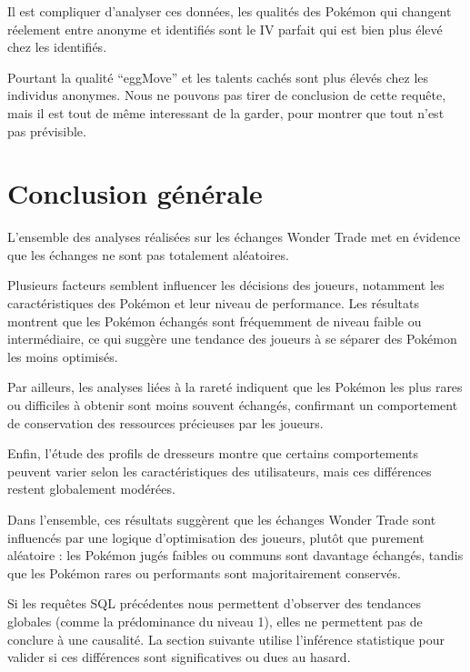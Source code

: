 \documentclass[mstat,12pt]{unswthesis}
\begin{document}
Il est compliquer d'analyser ces données, les qualités des Pokémon qui
changent réelement entre anonyme et identifiés sont le IV parfait qui
est bien plus élevé chez les identifiés.

Pourtant la qualité ``eggMove'' et les talents cachés sont plus élevés
chez les individus anonymes. Nous ne pouvons pas tirer de conclusion de
cette requête, mais il est tout de même interessant de la garder, pour
montrer que tout n'est pas prévisible.

\bigskip
\bigskip

\section{Conclusion générale}\label{conclusion-guxe9nuxe9rale}

L'ensemble des analyses réalisées sur les échanges Wonder Trade met en
évidence que les échanges ne sont pas totalement aléatoires.

Plusieurs facteurs semblent influencer les décisions des joueurs,
notamment les caractéristiques des Pokémon et leur niveau de
performance. Les résultats montrent que les Pokémon échangés sont
fréquemment de niveau faible ou intermédiaire, ce qui suggère une
tendance des joueurs à se séparer des Pokémon les moins optimisés.

Par ailleurs, les analyses liées à la rareté indiquent que les Pokémon
les plus rares ou difficiles à obtenir sont moins souvent échangés,
confirmant un comportement de conservation des ressources précieuses par
les joueurs.

Enfin, l'étude des profils de dresseurs montre que certains
comportements peuvent varier selon les caractéristiques des
utilisateurs, mais ces différences restent globalement modérées.

Dans l'ensemble, ces résultats suggèrent que les échanges Wonder Trade
sont influencés par une logique d'optimisation des joueurs, plutôt que
purement aléatoire : les Pokémon jugés faibles ou communs sont davantage
échangés, tandis que les Pokémon rares ou performants sont
majoritairement conservés.

\bigskip
\bigskip

Si les requêtes SQL précédentes nous permettent d'observer des tendances
globales (comme la prédominance du niveau 1), elles ne permettent pas de
conclure à une causalité. La section suivante utilise l'inférence
statistique pour valider si ces différences sont significatives ou dues
au hasard.
\end{document}
